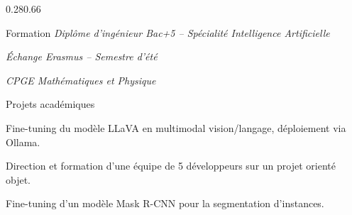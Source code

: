 \documentclass[a4paper]{resume} %
\begin{document}
\begin{rColumns}{0.28}{0.66}
\begin{rSection}{Formation}
         {\textit{Diplôme d'ingénieur Bac+5 -- Spécialité Intelligence Artificielle}}

         {\textit{Échange Erasmus -- Semestre d'été}}

         {\textit{CPGE Mathématiques et Physique}}

\end{rSection}

\begin{rSection}{Projets académiques}

         {Fine-tuning du modèle LLaVA en multimodal vision/langage, déploiement via Ollama.}

         {Direction et formation d'une équipe de 5 développeurs sur un projet orienté objet.}

         {Fine-tuning d'un modèle Mask R-CNN pour la segmentation d'instances.}

\end{rSection}

\end{rColumns}
\end{document}
